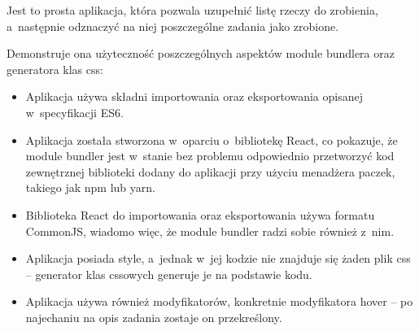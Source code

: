 \documentclass{SGGW-thesis}
\begin{document}
Jest to prosta aplikacja, która pozwala uzupełnić listę rzeczy do zrobienia, a~następnie odznaczyć na niej poszczególne zadania jako zrobione.

Demonstruje ona użyteczność poszczególnych aspektów module bundlera oraz generatora klas css:
\begin{itemize}
    \item Aplikacja używa składni importowania oraz eksportowania opisanej w~specyfikacji ES6.
    \item Aplikacja została stworzona w~oparciu o~bibliotekę React, co pokazuje, że module bundler jest w~stanie bez problemu odpowiednio przetworzyć kod zewnętrznej biblioteki dodany do aplikacji przy użyciu menadżera paczek, takiego jak npm lub yarn.
    \item Biblioteka React do importowania oraz eksportowania używa formatu CommonJS, wiadomo więc, że module bundler radzi sobie również z~nim.
    \item Aplikacja posiada style, a~jednak w~jej kodzie nie znajduje się żaden plik css -- generator klas cssowych generuje je na podstawie kodu.
    \item Aplikacja używa również modyfikatorów, konkretnie modyfikatora hover -- po najechaniu na opis zadania zostaje on przekreślony.
\end{itemize}
\end{document}
